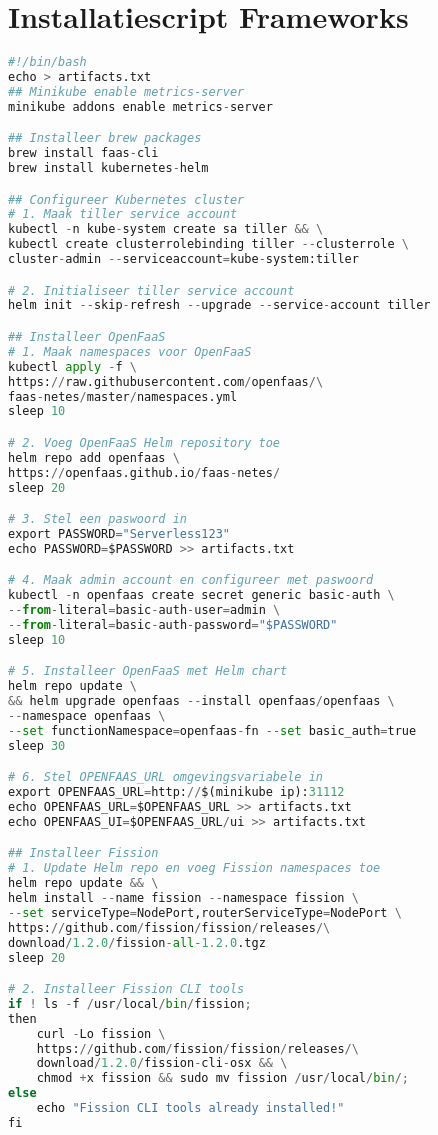 \newpage
\section{Installatiescript Frameworks}
\label{sec:installatie-frameworks}
\begin{lstlisting}[language=python]
#!/bin/bash
echo > artifacts.txt
## Minikube enable metrics-server
minikube addons enable metrics-server

## Installeer brew packages
brew install faas-cli
brew install kubernetes-helm

## Configureer Kubernetes cluster
# 1. Maak tiller service account
kubectl -n kube-system create sa tiller && \
kubectl create clusterrolebinding tiller --clusterrole \
cluster-admin --serviceaccount=kube-system:tiller

# 2. Initialiseer tiller service account
helm init --skip-refresh --upgrade --service-account tiller

## Installeer OpenFaaS
# 1. Maak namespaces voor OpenFaaS 
kubectl apply -f \
https://raw.githubusercontent.com/openfaas/\
faas-netes/master/namespaces.yml
sleep 10

# 2. Voeg OpenFaaS Helm repository toe
helm repo add openfaas \
https://openfaas.github.io/faas-netes/
sleep 20

# 3. Stel een paswoord in
export PASSWORD="Serverless123"
echo PASSWORD=$PASSWORD >> artifacts.txt

# 4. Maak admin account en configureer met paswoord
kubectl -n openfaas create secret generic basic-auth \
--from-literal=basic-auth-user=admin \
--from-literal=basic-auth-password="$PASSWORD"
sleep 10

# 5. Installeer OpenFaaS met Helm chart
helm repo update \
&& helm upgrade openfaas --install openfaas/openfaas \
--namespace openfaas \
--set functionNamespace=openfaas-fn --set basic_auth=true
sleep 30

# 6. Stel OPENFAAS_URL omgevingsvariabele in
export OPENFAAS_URL=http://$(minikube ip):31112
echo OPENFAAS_URL=$OPENFAAS_URL >> artifacts.txt
echo OPENFAAS_UI=$OPENFAAS_URL/ui >> artifacts.txt

## Installeer Fission
# 1. Update Helm repo en voeg Fission namespaces toe
helm repo update && \
helm install --name fission --namespace fission \
--set serviceType=NodePort,routerServiceType=NodePort \
https://github.com/fission/fission/releases/\
download/1.2.0/fission-all-1.2.0.tgz
sleep 20

# 2. Installeer Fission CLI tools
if ! ls -f /usr/local/bin/fission;
then
    curl -Lo fission \
    https://github.com/fission/fission/releases/\
    download/1.2.0/fission-cli-osx && \
    chmod +x fission && sudo mv fission /usr/local/bin/;
else
    echo "Fission CLI tools already installed!"
fi


\end{lstlisting}
